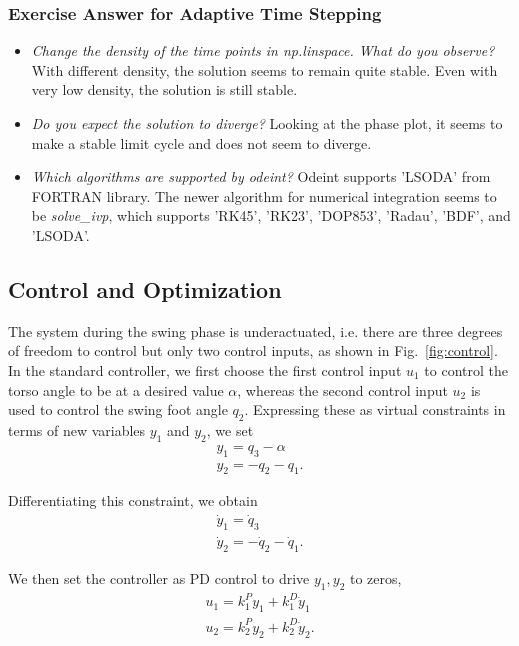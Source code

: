 \subsubsection{Exercise Answer for Adaptive Time Stepping}
\begin{itemize}

\item \emph{Change the density of the time points in np.linspace. What do you observe?}
With different density, the solution seems to remain quite stable. Even with very low density, the solution is still stable. 
\item \emph{Do you expect the solution to diverge?}
Looking at the phase plot, it seems to make a stable limit cycle and does not seem to diverge.
\item \emph{Which algorithms are supported by odeint?}
Odeint supports 'LSODA' from FORTRAN library. The newer algorithm for numerical integration seems to be \emph{solve\_ivp}, which supports 'RK45', 'RK23', 'DOP853', 'Radau', 'BDF', and 'LSODA'. 
\end{itemize}

\subsection{Control and Optimization}
\label{sec:control_opt}

The system during the swing phase is underactuated, i.e. there are three degrees of freedom to control but only two control inputs, as shown in Fig.~\ref{fig:control}. In the standard controller, we first choose the first control input $u_1$ to control the torso angle to be at a desired value $\alpha$, whereas the second control input $u_2$ is used to control the swing foot angle $q_2$. Expressing these as virtual constraints in terms of new variables $y_1$ and $y_2$, we set
\begin{align}
y_1 = q_3 - \alpha \\
y_2 = -q_2 - q_1. 
\end{align}

Differentiating this constraint, we obtain
\begin{align}
\dot{y}_1 = \dot{q}_3  \\
\dot{y}_2 = -\dot{q}_2 - \dot{q}_1. 
\end{align}

We then set the controller as PD control to drive $y_1, y_2$ to zeros,
\begin{align}
u_1 = k_1^P y_1 + k_1^D \dot{y}_1 \\
u_2 = k_2^P y_2 + k_2^D \dot{y}_2.
\end{align}

